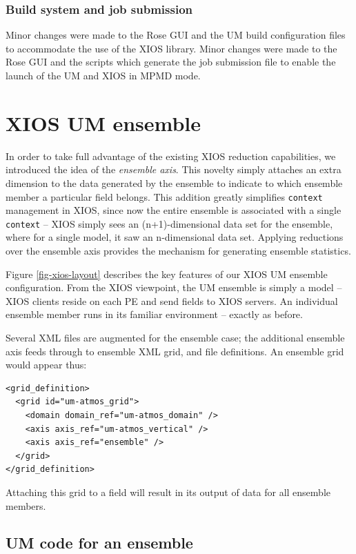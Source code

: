 \documentclass[twocolumn, 5p, times]{elsarticle}
\begin{document}
\subsubsection{Build system and job submission} 
Minor changes were made to the Rose GUI and the UM build configuration files to accommodate the use of the XIOS library. 
Minor changes were made to the Rose GUI and the scripts which generate the job submission file to enable the launch of the UM and XIOS in MPMD mode. 


\section{XIOS UM ensemble}
\label{um-ensemble}


In order to take full advantage of the existing XIOS reduction capabilities, we introduced the idea of the \textit{ensemble axis}. This novelty simply attaches an extra dimension to the data generated by the ensemble to indicate to which ensemble member a particular field belongs. This addition greatly simplifies \texttt{context} management in XIOS, since now the entire ensemble is associated with a single \texttt{context} -- XIOS simply sees an (n+1)-dimensional data set for the ensemble, where for a single model, it saw an n-dimensional data set. Applying reductions over the ensemble axis provides the mechanism for generating ensemble statistics.

Figure \ref{fig-xios-layout} describes the key features of our XIOS UM ensemble configuration. From the XIOS viewpoint, the UM ensemble is simply a model -- XIOS clients reside on each PE and send fields to XIOS servers. An individual ensemble member runs in its familiar environment -- exactly as before.

Several XML files are augmented for the ensemble case; the additional ensemble axis feeds through to ensemble XML grid, and file definitions. An ensemble grid would appear thus:

\begin{verbatim}
<grid_definition>
  <grid id="um-atmos_grid">
    <domain domain_ref="um-atmos_domain" />
    <axis axis_ref="um-atmos_vertical" />
    <axis axis_ref="ensemble" />
  </grid>
</grid_definition>
\end{verbatim}
Attaching this grid to a field will result in its output of data for all ensemble members.

\subsection{UM code for an ensemble}
\end{document}
